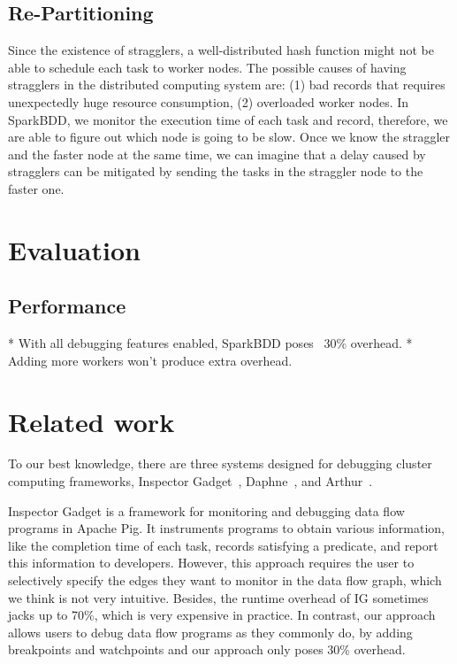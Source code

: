 \documentclass{acm_proc_article-sp}
\begin{document}
\subsection{Re-Partitioning}

Since the existence of stragglers, a well-distributed hash function might not be able to schedule each task to worker nodes. The possible causes of having stragglers in the distributed computing system are: (1) bad records that requires unexpectedly huge resource consumption, (2) overloaded worker nodes. In SparkBDD, we monitor the execution time of each task and record, therefore, we are able to figure out which node is going to be slow. Once we know the straggler and the faster node at the same time, we can imagine that a delay caused by stragglers can be mitigated by sending the tasks in the straggler node to the faster one. 

\section{Evaluation}
\subsection{Performance}
* With all debugging features enabled, SparkBDD poses ~30\% overhead.
* Adding more workers won't produce extra overhead.


\section{Related work}
To our best knowledge, there are three systems designed for debugging cluster computing frameworks, Inspector Gadget~\cite{olston2011inspector}, Daphne~\cite{jagannath2011monitoring}, and Arthur~\cite{dave2013arthur}. 

Inspector Gadget is a framework for monitoring and debugging data flow programs in Apache Pig. It instruments programs to obtain various information, like the completion time of each task, records satisfying a predicate, and report this information to developers. However, this approach requires the user to selectively specify the edges they want to monitor in the data flow graph, which we think is not very intuitive. Besides, the runtime overhead of IG sometimes jacks up to 70\%, which is very expensive in practice. In contrast, our approach allows users to debug data flow programs as they commonly do, by adding breakpoints and watchpoints and our approach only poses 30\% overhead. 
\end{document}
